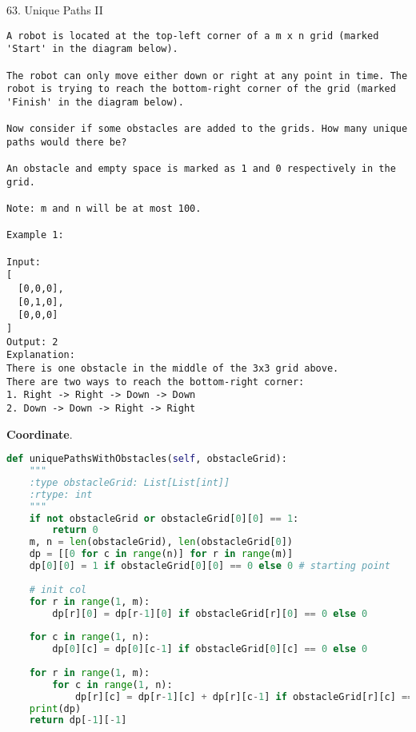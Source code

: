 \documentclass[../main.tex]{subfiles}
\begin{document}
63. Unique Paths II
\begin{lstlisting}
A robot is located at the top-left corner of a m x n grid (marked 'Start' in the diagram below).

The robot can only move either down or right at any point in time. The robot is trying to reach the bottom-right corner of the grid (marked 'Finish' in the diagram below).

Now consider if some obstacles are added to the grids. How many unique paths would there be?

An obstacle and empty space is marked as 1 and 0 respectively in the grid.

Note: m and n will be at most 100.

Example 1:

Input:
[
  [0,0,0],
  [0,1,0],
  [0,0,0]
]
Output: 2
Explanation:
There is one obstacle in the middle of the 3x3 grid above.
There are two ways to reach the bottom-right corner:
1. Right -> Right -> Down -> Down
2. Down -> Down -> Right -> Right
\end{lstlisting}
\textbf{Coordinate}. 
\begin{lstlisting}[language=Python]
def uniquePathsWithObstacles(self, obstacleGrid):
    """
    :type obstacleGrid: List[List[int]]
    :rtype: int
    """
    if not obstacleGrid or obstacleGrid[0][0] == 1:
        return 0
    m, n = len(obstacleGrid), len(obstacleGrid[0])
    dp = [[0 for c in range(n)] for r in range(m)]
    dp[0][0] = 1 if obstacleGrid[0][0] == 0 else 0 # starting point
    
    # init col
    for r in range(1, m):
        dp[r][0] = dp[r-1][0] if obstacleGrid[r][0] == 0 else 0
        
    for c in range(1, n):
        dp[0][c] = dp[0][c-1] if obstacleGrid[0][c] == 0 else 0
        
    for r in range(1, m):
        for c in range(1, n):
            dp[r][c] = dp[r-1][c] + dp[r][c-1] if obstacleGrid[r][c] == 0 else 0
    print(dp)
    return dp[-1][-1]
\end{lstlisting}
\end{document}
